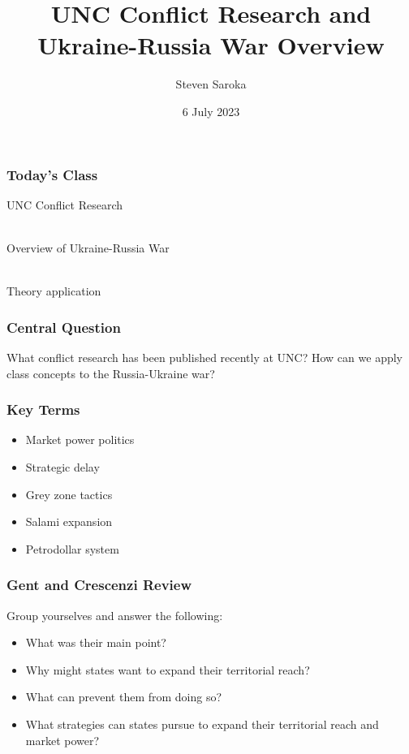 \documentclass[handout]{beamer}
\title[UNC Conflict Research]{\LARGE{UNC Conflict Research and Ukraine-Russia War Overview}}
\author[POLI 150]{Steven Saroka}
\institute{POLI 150}
\date{6 July 2023}
\begin{document}
	
	\begin{frame}
		\titlepage %
	\end{frame}
	
	
	
	
	\begin{frame} 
		\frametitle{\LARGE{Today's Class}}
		\begin{itemize}
			\Large{
				\item UNC Conflict Research
				\\~\\
				\item Overview of Ukraine-Russia War
				\\~\\ 
				\item Theory application}
		\end{itemize}
	\end{frame}
	
\begin{frame} 
	\frametitle{\LARGE{Central Question}}
	\centering
	\Large{What conflict research has been published recently at UNC? How can we apply class concepts to the Russia-Ukraine war?}
\end{frame}

\begin{frame} 
	\frametitle{\LARGE{Key Terms}}
	\begin{itemize}
		\item Market power politics
		\item Strategic delay
		\item Grey zone tactics
		\item Salami expansion
		\item Petrodollar system
	\end{itemize}
\end{frame}

\begin{frame} 
	\frametitle{\LARGE{Gent and Crescenzi Review}}
	Group yourselves and answer the following:
	\begin{itemize}
		\item What was their main point?
		\item Why might states want to expand their territorial reach?
		\item What can prevent them from doing so?
		\item What strategies can states pursue to expand their territorial reach and market power?
	\end{itemize}
\end{frame}
\end{document}
